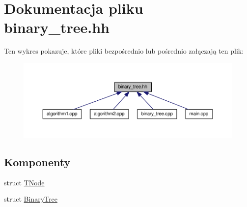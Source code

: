 \hypertarget{binary__tree_8hh}{\section{Dokumentacja pliku binary\-\_\-tree.\-hh}
\label{binary__tree_8hh}
}
Ten wykres pokazuje, które pliki bezpośrednio lub pośrednio załączają ten plik\-:
\nopagebreak
\begin{figure}[H]
\begin{center}
\leavevmode
\includegraphics[width=350pt]{binary__tree_8hh__dep__incl}
\end{center}
\end{figure}
\subsection*{Komponenty}
\begin{DoxyCompactItemize}
\item 
struct \hyperlink{struct_t_node}{T\-Node}
\item 
struct \hyperlink{struct_binary_tree}{Binary\-Tree}
\end{DoxyCompactItemize}
